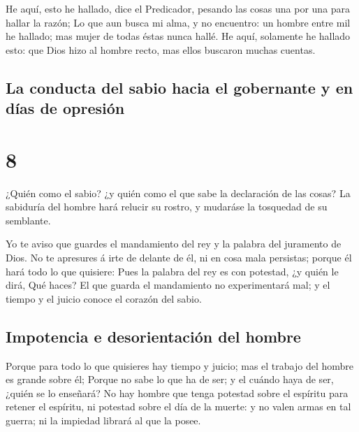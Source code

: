  He aquí, esto he hallado, dice el Predicador, pesando
las cosas una por una para hallar la razón;  Lo que aun
busca mi alma, y no encuentro: un hombre entre mil he hallado; mas mujer
de todas éstas nunca hallé.  He aquí, solamente he
hallado esto: que Dios hizo al hombre recto, mas ellos buscaron muchas
cuentas.

\hypertarget{la-conducta-del-sabio-hacia-el-gobernante-y-en-duxedas-de-opresiuxf3n}{%
\subsection{La conducta del sabio hacia el gobernante y en días de
opresión}\label{la-conducta-del-sabio-hacia-el-gobernante-y-en-duxedas-de-opresiuxf3n}}

\hypertarget{section-7}{%
\section{8}\label{section-7}}

 ¿Quién como el sabio? ¿y quién como el que sabe la
declaración de las cosas? La sabiduría del hombre hará relucir su
rostro, y mudaráse la tosquedad de su semblante.

 Yo te aviso que guardes el mandamiento del rey y la
palabra del juramento de Dios.  No te apresures á irte de
delante de él, ni en cosa mala persistas; porque él hará todo lo que
quisiere:  Pues la palabra del rey es con potestad, ¿y
quién le dirá, Qué haces?  El que guarda el mandamiento no
experimentará mal; y el tiempo y el juicio conoce el corazón del sabio.

\hypertarget{impotencia-e-desorientaciuxf3n-del-hombre}{%
\subsection{Impotencia e desorientación del
hombre}\label{impotencia-e-desorientaciuxf3n-del-hombre}}

 Porque para todo lo que quisieres hay tiempo y juicio;
mas el trabajo del hombre es grande sobre él;  Porque no
sabe lo que ha de ser; y el cuándo haya de ser, ¿quién se lo enseñará?
 No hay hombre que tenga potestad sobre el espíritu para
retener el espíritu, ni potestad sobre el día de la muerte: y no valen
armas en tal guerra; ni la impiedad librará al que la posee.

